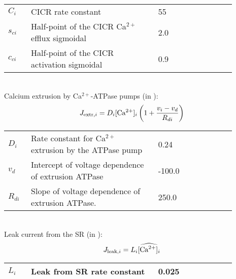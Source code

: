 %
\begin{table}[h!]
\centering
\begin{tabular}{ p{0.09\linewidth}  >{\footnotesize} p{0.5\linewidth}  >{\footnotesize} p{0.27\linewidth} >{\footnotesize} p{0.03\linewidth} }
\hline
$C_{i}$      			& CICR rate constant									& 55 \uMs		& \cite{Koenigsberger2006} \\
$s_{ci}$				& Half-point of the CICR Ca$^{2+}$ efflux sigmoidal			& 2.0 \uM		& \cite{Koenigsberger2006} \\
$c_{ci}$				& Half-point of the CICR activation sigmoidal			& 0.9 \uM		& \cite{Koenigsberger2006} \\
\hline
\end{tabular}
\label{tab:JCICRi}
\end{table}
\\
%
Calcium extrusion by Ca$^{2+}$-ATPase pumps (in \uMs):
\begin{equation} \label{eq:Jextrusioni}
J_{\text{extr},i} = D_{i}\text{[Ca$^{2+}$]$_i$}   \left( 1+ \frac{v_{i}-v_{d}}{R_{di}}\right)
\end{equation}
%
\begin{table}[h!]
\centering
\begin{tabular}{ p{0.09\linewidth}  >{\footnotesize} p{0.5\linewidth}  >{\footnotesize} p{0.27\linewidth} >{\footnotesize} p{0.03\linewidth} }
\hline
$D_{i}$      			& Rate constant for Ca$^{2+}$ extrusion by the ATPase pump		 & 0.24	\pers			& \cite{Koenigsberger2006} \\
$v_{d}$					& Intercept of voltage dependence of extrusion ATPase			 & -100.0 \mV			& \cite{Koenigsberger2006} \\
$R_{di}$				& Slope of voltage dependence of extrusion ATPase.				 & 250.0 \mV			& \cite{Koenigsberger2006} \\
\hline
\end{tabular}
\label{tab:Jextrusioni}
\end{table}
\\
%
Leak current from the SR (in \uMs):
\begin{equation} \label{eq:JSRleaki}
J_{\text{leak},i} = L_{i}\widehat{\text{[Ca$^{2+}$]$_i$}}
\end{equation}
\begin{table}[h!]
\centering
\begin{tabular}{ p{0.09\linewidth}  >{\footnotesize} p{0.5\linewidth}  >{\footnotesize} p{0.27\linewidth} >{\footnotesize} p{0.03\linewidth} }
\hline
$L_{i}$      			& Leak from SR rate constant						 & 0.025 \pers				& \cite{Koenigsberger2006} \\
\hline
\end{tabular}
\label{tab:Jleaki}
\end{table}
\\

